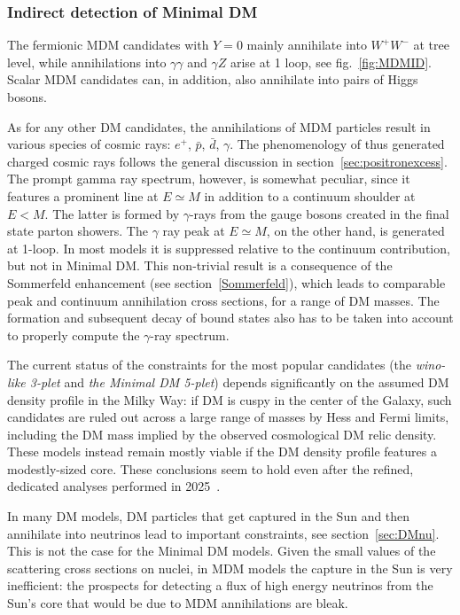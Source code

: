 \subsubsection{Indirect detection of Minimal DM}
The fermionic MDM candidates with $Y=0$ mainly annihilate  into $W^+W^-$ at tree level, while 
annihilations into $\gamma\gamma$ and $\gamma Z$ arise at 1 loop, see fig.~\ref{fig:MDMID}. 
Scalar MDM candidates can, in addition, also annihilate into pairs of Higgs bosons.

As for any other DM candidates, the annihilations of MDM particles result in various species of cosmic rays: $e^+$, $\bar p$, $\bar d$, $\gamma$. The phenomenology of thus generated charged cosmic rays follows the general discussion in section~\ref{sec:positronexcess}. 
The prompt gamma ray spectrum, however, is somewhat peculiar, since it features a prominent line at $E \simeq M$ in addition to a continuum shoulder at $E < M$. The latter is formed by $\gamma$-rays from the gauge bosons created in the final state parton showers. 
The  $\gamma$ ray peak at $E\simeq M$, on the other hand, is generated at 1-loop. In most models it is suppressed relative to the continuum contribution, but not in  Minimal DM.
This non-trivial result is a consequence of the Sommerfeld enhancement (see section~\ref{Sommerfeld}), which leads to comparable peak and continuum annihilation cross sections, for a range of DM masses. The formation and subsequent decay of bound states also has to be taken into account to properly compute the $\gamma$-ray spectrum.
 
The current status of the constraints for the most popular candidates (the {\em wino-like 3-plet} and {\em the Minimal DM 5-plet}) depends significantly on the assumed DM density profile in the Milky Way: if DM is cuspy in the center of the Galaxy, such candidates
 are ruled out across a large range of masses by {\sc Hess} and {\sc Fermi} limits, including the DM mass implied by the observed cosmological DM relic density. These models instead remain mostly viable if the DM density profile features a modestly-sized core. These conclusions seem to hold even after the refined, dedicated analyses performed in 2025~\cite{MDM}. 


In many DM models, DM particles that get captured in the Sun and then annihilate into neutrinos lead to important constraints, see section~\ref{sec:DMnu}. This is not the case for the Minimal DM models. Given the small values of the scattering cross sections on nuclei, in MDM models the capture in the Sun is very inefficient: the prospects for detecting a flux of high energy neutrinos from the Sun's core that would be due to MDM annihilations are bleak.

